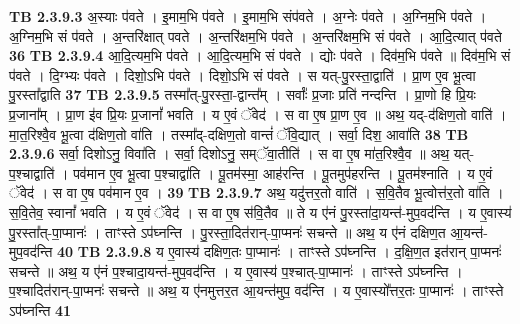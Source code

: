 \documentclass[17pt]{extarticle}
\begin{document}
                                \textbf{ TB 2.3.9.3} \newline
                  अ॒स्याः प॑वते । इ॒माम॒भि प॑वते । इ॒माम॒भि संप॑वते । अ॒ग्नेः प॑वते । अ॒ग्निम॒भि प॑वते । अ॒ग्निम॒भि सं प॑वते । अ॒न्तरि॑क्षात् पवते । अ॒न्तरि॑क्षम॒भि प॑वते । अ॒न्तरि॑क्षम॒भि सं प॑वते । आ॒दि॒त्यात् प॑वते \textbf{ 36} \newline
                  \newline
                                \textbf{ TB 2.3.9.4} \newline
                  आ॒दि॒त्यम॒भि प॑वते । आ॒दि॒त्यम॒भि सं प॑वते । द्योः प॑वते । दिव॑म॒भि प॑वते ॥ दिव॑म॒भि सं प॑वते । दि॒ग्भ्यः प॑वते । दिशो॒ऽभि प॑वते । दिशो॒ऽभि सं प॑वते । स यत्-पु॒रस्ता॒द्वाति॑ । प्रा॒ण ए॒व भू॒त्वा पु॒रस्ता᳚द्वाति \textbf{ 37} \newline
                  \newline
                                \textbf{ TB 2.3.9.5} \newline
                  तस्मा᳚त्-पु॒रस्ता॒-द्वान्त᳚म् । सर्वाः᳚ प्र॒जाः प्रति॑ नन्दन्ति । प्रा॒णो हि प्रि॒यः प्र॒जाना᳚म् । प्रा॒ण इ॑व प्रि॒यः प्र॒जानां᳚ भवति । य ए॒वं ॅवेद॑ । स वा ए॒ष प्रा॒ण ए॒व ॥ अथ॒ यद्-द॑क्षिण॒तो वाति॑ । मा॒त॒रिश्वै॒व भू॒त्वा द॑क्षिण॒तो वा॑ति । तस्मा᳚द्-दक्षिण॒तो वान्तं॑ ॅवि॒द्यात् । सर्वा॒ दिश॒ आवा॑ति \textbf{ 38} \newline
                  \newline
                                \textbf{ TB 2.3.9.6} \newline
                  सर्वा॒ दिशोऽनु॒ विवा॑ति । सर्वा॒ दिशोऽनु॒ सम्ॅवा॒तीति॑ । स वा ए॒ष मा॑त॒रिश्वै॒व ॥ अथ॒ यत्-प॒श्चाद्वाति॑ । पव॑मान ए॒व भू॒त्वा प॒श्चाद्वा॑ति । पू॒तम॑स्मा॒ आह॑रन्ति । पू॒तमुप॑हरन्ति । पू॒तम॑श्नाति । य ए॒वं ॅवेद॑ । स वा ए॒ष पव॑मान ए॒व । \textbf{ 39} \newline
                  \newline
                                \textbf{ TB 2.3.9.7} \newline
                  अथ॒ यदु॑त्तर॒तो वाति॑ । स॒वि॒तैव भू॒त्वोत्त॑र॒तो वा॑ति । स॒वि॒तेव॒ स्वानां᳚ भवति । य ए॒वं ॅवेद॑ । स वा ए॒ष स॑वि॒तैव ॥ ते य ए॑नं पु॒रस्ता॑दा॒यन्त॑-मुप॒वद॑न्ति । य ए॒वास्य॑ पु॒रस्ता᳚त्-पा॒प्मानः॑ । ताꣳस्ते ऽप॑घ्नन्ति । पु॒रस्ता॒दित॑रान्-पा॒प्मनः॑ सचन्ते ॥ अथ॒ य ए॑नं दक्षिण॒त आ॒यन्त॑-मुप॒वद॑न्ति \textbf{ 40} \newline
                  \newline
                                \textbf{ TB 2.3.9.8} \newline
                  य ए॒वास्य॑ दक्षिण॒तः पा॒प्मानः॑ । ताꣳस्ते ऽप॑घ्नन्ति । द॒क्षि॒ण॒त इत॑रान् पा॒प्मनः॑ सचन्ते ॥ अथ॒ य ए॑नं प॒श्चादा॒यन्त॑-मुप॒वद॑न्ति । य ए॒वास्य॑ प॒श्चात्-पा॒प्मानः॑ । ताꣳस्ते ऽप॑घ्नन्ति । प॒श्चादित॑रान्-पा॒प्मनः॑ सचन्ते ॥ अथ॒ य ए॑नमुत्तर॒त आ॒यन्त॑मुप॒ वद॑न्ति । य ए॒वास्यो᳚त्तर॒तः पा॒प्मानः॑ । ताꣳस्ते ऽप॑घ्नन्ति \textbf{ 41} \newline
\end{document}

